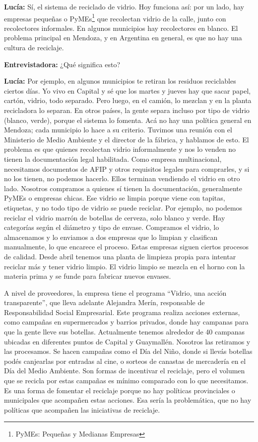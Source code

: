 \textbf{Lucía:} Sí, el sistema de reciclado de vidrio. Hoy funciona así: por un lado, hay empresas pequeñas o PyMEs\footnote{PyMEs: Pequeñas y Medianas Empresas} que recolectan vidrio de la calle, junto con recolectores informales. En algunos municipios hay recolectores en blanco. El problema principal en Mendoza, y en Argentina en general, es que no hay una cultura de reciclaje.

\textbf{Entrevistadora:} ¿Qué significa esto?

\textbf{Lucía:} Por ejemplo, en algunos municipios te retiran los residuos reciclables ciertos días. Yo vivo en Capital y sé que los martes y jueves hay que sacar papel, cartón, vidrio, todo separado. Pero luego, en el camión, lo mezclan y en la planta recicladora lo separan. En otros países, la gente separa incluso por tipo de vidrio (blanco, verde), porque el sistema lo fomenta. Acá no hay una política general en Mendoza; cada municipio lo hace a su criterio. Tuvimos una reunión con el Ministerio de Medio Ambiente y el director de la fábrica, y hablamos de esto. El problema es que quienes recolectan vidrio informalmente y nos lo venden no tienen la documentación legal habilitada. Como empresa multinacional, necesitamos documentos de AFIP y otros requisitos legales para comprarles, y si no los tienen, no podemos hacerlo. Ellos terminan vendiendo el vidrio en otro lado. Nosotros compramos a quienes sí tienen la documentación, generalmente PyMEs o empresas chicas. Ese vidrio se limpia porque viene con tapitas, etiquetas, y no todo tipo de vidrio se puede reciclar. Por ejemplo, no podemos reciclar el vidrio marrón de botellas de cerveza, solo blanco y verde. Hay categorías según el diámetro y tipo de envase. Compramos el vidrio, lo almacenamos y lo enviamos a dos empresas que lo limpian y clasifican manualmente, lo que encarece el proceso. Estas empresas siguen ciertos procesos de calidad. Desde abril tenemos una planta de limpieza propia para intentar reciclar más y tener vidrio limpio. El vidrio limpio se mezcla en el horno con la materia prima y se funde para fabricar nuevos envases. 

A nivel de proveedores, la empresa tiene el programa ``Vidrio, una acción transparente'', que lleva adelante Alejandra Merín, responsable de Responsabilidad Social Empresarial. Este programa realiza acciones externas, como campañas en supermercados y barrios privados, donde hay campanas para que la gente lleve sus botellas. Actualmente tenemos alrededor de 40 campanas ubicadas en diferentes puntos de Capital y Guaymallén. Nosotros las retiramos y las procesamos. Se hacen campañas como el Día del Niño, donde si llevás botellas podés canjearlas por entradas al cine, o sorteos de canastas de mercadería en el Día del Medio Ambiente. Son formas de incentivar el reciclaje, pero el volumen que se recicla por estas campañas es mínimo comparado con lo que necesitamos. Es una forma de fomentar el reciclaje porque no hay políticas provinciales o municipales que acompañen estas acciones. Esa sería la problemática, que no hay políticas que acompañen las iniciativas de reciclaje.

